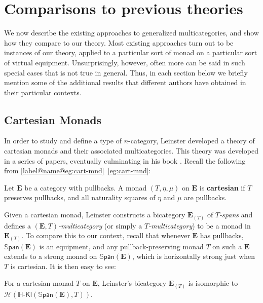 \documentclass{tac}
\makeatletter
\newcommand{\calH}{\ensuremath{\mathcal{H}}}
\newcommand{\mb}[1]{{\mathbf{#1}}}
\newcommand{\SPAN}[1]{\mathbb{S}\mathsf{pan}\!\left(\mb{#1}\right)}
\newcommand{\Hkl}[2]{\mathbb{H}\text{-}\mathsf{Kl}(\mathbb{#1},#2)}
\numberwithin{equation}{section}
\def\currthmtype{}
\def\autoref#1{\ref*{label@name@#1}~\ref{#1}}
\def\autoref#1{\ref{label@name@#1}~\ref{#1}}
\let\old@label\label
\def\label#1{%
    {\let\your@currentlabel\@currentlabel%
      \edef\@currentlabel{\currthmtype}%
      \old@label{label@name@#1}}%
    \old@label{#1}}
\makeatother
\begin{document}

\section{Comparisons to previous theories}
\label{sec:comparisons}

We now describe the existing approaches to generalized
multicategories, and show how they compare to our theory.  Most
existing approaches turn out to be instances of our theory, applied to
a particular sort of monad on a particular sort of virtual equipment.
Unsurprisingly, however, often more can be said in such special cases
that is not true in general.  Thus, in each section below we briefly
mention some of the additional results that different authors have
obtained in their particular contexts.



\subsection{Cartesian Monads}\label{section:cartesian}

In order to study and define a type of $n$-category, Leinster
developed a theory of cartesian monads and their associated
multicategories.  This theory was developed in a series of papers,
eventually culminating in his book \cite{leinster:higher-opds}.  Recall
the following from \autoref{eg:cart-mnd}:

\begin{definition}
Let $\mb{E}$ be a category with pullbacks.  A monad $(T, \eta, \mu)$ on
$\mb{E}$ is \textbf{cartesian} if $T$ preserves pullbacks, and all
naturality squares of $\eta$ and $\mu$ are pullbacks.
\end{definition}

Given a cartesian monad, Leinster constructs a bicategory
$\mb{E}_{(T)}$ of \emph{$T$-spans} and defines a \emph{$(\mb{E},
  T)$-multicategory} (or simply a \emph{$T$-multicategory}) to be a
monad in $\mb{E}_{(T)}$.  To compare this to our context, recall that
whenever $\mb{E}$ has pullbacks, $\SPAN{E}$ is an equipment, and any
pullback-preserving monad $T$ on such a $\mb{E}$ extends to a strong
monad on $\SPAN{E}$, which is horizontally strong just when $T$ is
cartesian.  It is then easy to see:

\begin{proposition}
  For a cartesian monad $T$ on $\mb{E}$, Leinster's bicategory
  $\mb{E}_{(T)}$ is isomorphic to $\calH(\Hkl{\SPAN{E}}{T})$.
\end{proposition}
\end{document}
